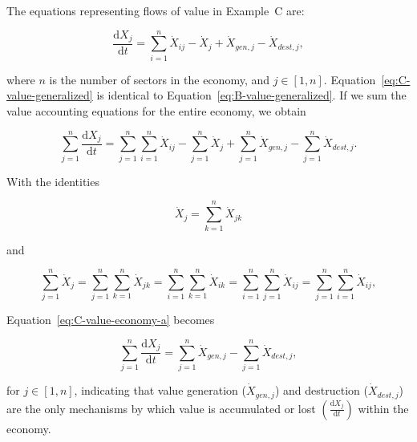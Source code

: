 The equations representing flows of value in Example~C are:

\begin{equation}\label{eq:C-value-generalized}
	\frac{\mathrm{d}X_{j}}{\mathrm{d}t}
	= \sum\limits_{i=1}^{n} \dot{X}_{ij}
	- \dot{X}_{j}
	+ \dot{X}_{gen,j}
	- \dot{X}_{dest,j},
\end{equation}

\noindent{}where $n$ is the number of sectors in the economy, and $j \in [1, n]$.
Equation~\ref{eq:C-value-generalized} is identical to Equation~\ref{eq:B-value-generalized}.
If we sum the value accounting equations for the entire economy, 
we obtain

\begin{equation}\label{eq:C-value-economy-a}
	\sum\limits_{j=1}^{n} \frac{\mathrm{d}X_{j}}{\mathrm{d}t}
	= \sum\limits_{j=1}^{n} \sum\limits_{i=1}^{n} \dot{X}_{ij}
	- \sum\limits_{j=1}^{n} \dot{X}_{j}
	+ \sum\limits_{j=1}^{n} \dot{X}_{gen,j}
	- \sum\limits_{j=1}^{n} \dot{X}_{dest,j}.
\end{equation}

\noindent{}With the identities

\begin{equation} \label{eq:X_identity_1}
	\dot{X}_{j}  
	= \sum\limits_{k=1}^n \dot{X}_{jk}
\end{equation}

\noindent{}and

\begin{equation} \label{eq:X_identity_2}
	\sum\limits_{j=1}^n\dot{X}_{j}  
	= \sum\limits_{j=1}^n \sum\limits_{k=1}^n \dot{X}_{jk}
	= \sum\limits_{i=1}^n \sum\limits_{k=1}^n \dot{X}_{ik}
	= \sum\limits_{i=1}^n \sum\limits_{j=1}^n \dot{X}_{ij}
	= \sum\limits_{j=1}^n \sum\limits_{i=1}^n \dot{X}_{ij},
\end{equation}

\noindent{}Equation~\ref{eq:C-value-economy-a} becomes

\begin{equation}\label{eq:C-value-economy-b}
	\sum\limits_{j=1}^{n} \frac{\mathrm{d}X_{j}}{\mathrm{d}t}
	= \sum\limits_{j=1}^{n} \dot{X}_{gen,j}
	- \sum\limits_{j=1}^{n} \dot{X}_{dest,j},
\end{equation}

\noindent{}for $j \in [1, n]$, indicating that 
value generation ($\dot{X}_{gen,j}$) 
and destruction ($\dot{X}_{dest,j}$)
are the only mechanisms by which value is accumulated or lost
$\left( \frac{\mathrm{d}X_{j}}{\mathrm{d}t} \right)$
within the economy.


